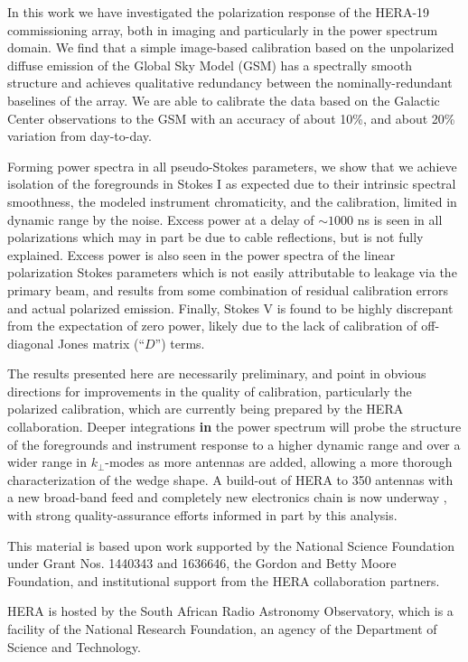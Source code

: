 \documentclass[twocolumn, trackchanges]{aastex61}
\newcommand{\edited}[1]{{\bf \color{blue} #1}}
\begin{document}
In this work we have investigated the polarization response of the HERA-19
commissioning array, both in imaging and particularly in the power spectrum
domain.  We find that a simple image-based calibration based on the unpolarized
diffuse emission of the Global Sky Model (GSM) has a spectrally smooth structure
and achieves qualitative redundancy between the nominally-redundant baselines of
the array.  We are able to calibrate the data based on the Galactic Center
observations to the GSM with an accuracy of about 10\%, and about 20\% variation
from day-to-day.

Forming power spectra in all pseudo-Stokes parameters, we show that we achieve
isolation of the foregrounds in Stokes I as expected due to their intrinsic
spectral smoothness, the modeled instrument chromaticity, and the calibration,
limited in dynamic range by the noise.  Excess power at a delay of $\sim1000$ ns
is seen in all polarizations which may in part be due to cable reflections, but
is not fully explained.  Excess power is also seen in the power spectra of the
linear polarization Stokes parameters which is not easily attributable to
leakage via the primary beam, and results from some combination of residual
calibration errors and actual polarized emission.  Finally, Stokes V is found to
be highly discrepant from the expectation of zero power, likely due to the lack
of calibration of off-diagonal Jones matrix (``$D$'') terms.

The results presented here are necessarily preliminary, and point in obvious
directions for improvements in the quality of calibration, particularly the
polarized calibration, which are currently being prepared by the HERA
collaboration.  Deeper integrations \edited{in} the power spectrum will probe
the structure of the foregrounds and instrument response to a higher dynamic
range and over a wider range in $k_{\perp}$-modes as more antennas are added,
allowing a more thorough characterization of the wedge shape.  A build-out of
HERA to 350 antennas with a new broad-band feed and completely new electronics
chain is now underway \cite{deBoer17}, with strong quality-assurance efforts
informed in part by this analysis.


\acknowledgements

This material is based upon work supported by the National Science Foundation
under Grant Nos. 1440343 and 1636646, the Gordon and Betty Moore Foundation, and
institutional support from the HERA collaboration partners.

HERA is hosted by the South African Radio Astronomy Observatory, which is a
facility of the National Research Foundation, an agency of the Department of
Science and Technology.
\end{document}
